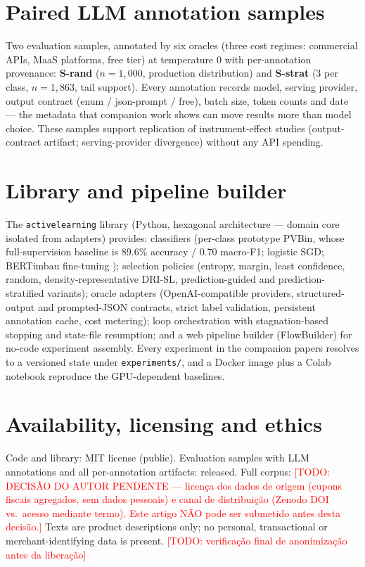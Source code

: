 \documentclass[11pt]{article}
\newcommand{\todo}[1]{\textcolor{red}{[TODO: #1]}}
\begin{document}
\section{Paired LLM annotation samples}
\label{sec:samples}

Two evaluation samples, annotated by six oracles (three cost regimes:
commercial APIs, MaaS platforms, free tier) at temperature 0 with
per-annotation provenance: \textbf{S-rand} ($n=1{,}000$, production
distribution) and \textbf{S-strat} (3 per class, $n=1{,}863$, tail
support). Every annotation records model, serving provider, output
contract (enum / json-prompt / free), batch size, token counts and
date --- the metadata that companion work shows can move results more
than model choice. These samples support replication of
instrument-effect studies (output-contract artifact; serving-provider
divergence) without any API spending.

\section{Library and pipeline builder}
\label{sec:library}

The \texttt{activelearning} library (Python, hexagonal architecture ---
domain core isolated from adapters) provides: classifiers (per-class
prototype PVBin, whose full-supervision baseline is 89.6\% accuracy /
0.70 macro-F1; logistic SGD; BERTimbau fine-tuning
\citep{Souza2020BERTimbau}); selection policies (entropy, margin, least
confidence, random, density-representative DRI-SL, prediction-guided and
prediction-stratified variants); oracle adapters (OpenAI-compatible
providers, structured-output and prompted-JSON contracts, strict label
validation, persistent annotation cache, cost metering); loop
orchestration with stagnation-based stopping and state-file resumption;
and a web pipeline builder (FlowBuilder) for no-code experiment
assembly. Every experiment in the companion papers resolves to a
versioned state under \texttt{experiments/}, and a Docker image plus a
Colab notebook reproduce the GPU-dependent baselines.

\section{Availability, licensing and ethics}
\label{sec:availability}

Code and library: MIT license (public). Evaluation samples with LLM
annotations and all per-annotation artifacts: released. Full corpus:
\todo{DECISÃO DO AUTOR PENDENTE --- licença dos dados de origem
(cupons fiscais agregados, sem dados pessoais) e canal de distribuição
(Zenodo DOI vs.\ acesso mediante termo). Este artigo NÃO pode ser
submetido antes desta decisão.} Texts are product descriptions only;
no personal, transactional or merchant-identifying data is present.
\todo{verificação final de anonimização antes da liberação}
\end{document}
